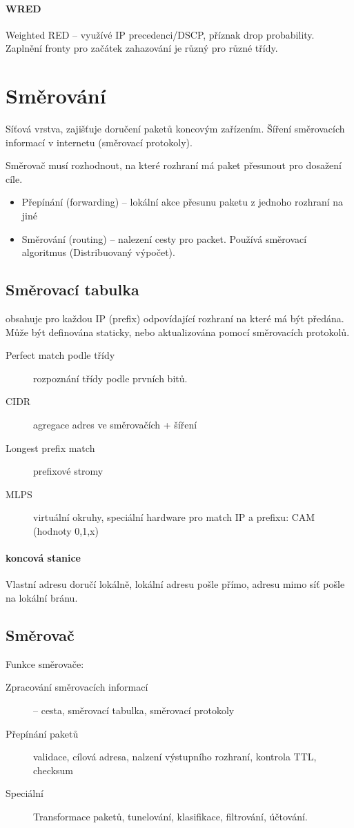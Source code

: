 \documentclass[a4paper, 11pt]{report}
\begin{document}
\paragraph{WRED} Weighted RED -- využívé IP precedenci/DSCP, příznak drop probability. Zaplnění fronty pro začátek zahazování je různý pro různé třídy.

\section{Směrování}

Síťová vrstva, zajišťuje doručení paketů koncovým zařízením. Šíření směrovacích informací v internetu (směrovací protokoly).

Směrovač musí rozhodnout, na které rozhraní má paket přesunout pro dosažení cíle.
\begin{itemize}
	\item Přepínání (forwarding) -- lokální akce přesunu paketu z jednoho rozhraní na jiné
	\item Směrování (routing) -- nalezení cesty pro packet. Používá směrovací algoritmus (Distribuovaný výpočet).
\end{itemize}

\subsection{Směrovací tabulka} obsahuje pro každou IP (prefix) odpovídající rozhraní na které má být předána. Může být definována staticky, nebo aktualizována pomocí směrovacích protokolů.
\begin{description}
	\item[Perfect match podle třídy] rozpoznání třídy podle prvních bitů.
	\item[CIDR] agregace adres ve směrovačích + šíření
	\item[Longest prefix match] prefixové stromy
	\item[MLPS] virtuální okruhy, speciální hardware pro match IP a prefixu: CAM (hodnoty 0,1,x)
\end{description}

\paragraph{koncová stanice} Vlastní adresu doručí lokálně, lokální adresu pošle přímo, adresu mimo síť pošle na lokální bránu.

\subsection{Směrovač}
Funkce směrovače:
\begin{description}
	\item[Zpracování směrovacích informací] -- cesta, směrovací tabulka, směrovací protokoly
	\item[Přepínání paketů] validace, cílová adresa, nalzení výstupního rozhraní, kontrola TTL, checksum
	\item[Speciální] Transformace paketů, tunelování, klasifikace, filtrování, účtování.
\end{description}
\end{document}
